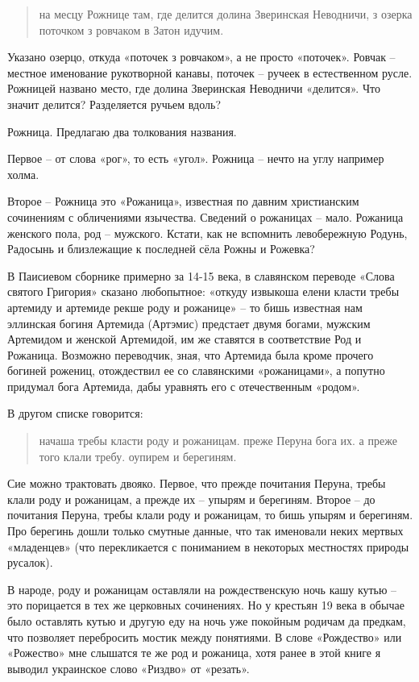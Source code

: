 \begin{quotation}
на месцу Рожнице там, где делится долина Зверинская Неводничи, з озерка поточком з ровчаком в Затон идучим.
\end{quotation} 

Указано озерцо, откуда «поточек з ровчаком», а не просто «поточек». Ровчак – местное именование рукотворной канавы, поточек – ручеек в естественном русле. Рожницей названо место, где долина Зверинская Неводничи «делится». Что значит делится? Разделяется ручьем вдоль?

Рожница. Предлагаю два толкования названия.

Первое – от слова «рог», то есть «угол». Рожница – нечто на углу например холма.

Второе – Рожница это «Рожаница», известная по давним христианским сочинениям с обличениями язычества. Сведений о рожаницах – мало. Рожаница женского пола, род – мужского. Кстати, как не вспомнить левобережную Родунь, Радосынь и близлежащие к последней сёла Рожны и Рожевка?

В Паисиевом сборнике примерно за 14-15 века, в славянском переводе «Слова святого Григория» сказано любопытное: «откуду извыкоша елени класти требы артемиду и артемиде рекше роду и рожанице» – то бишь известная нам эллинская богиня Артемида (Артэмис) предстает двумя богами, мужским Артемидом и женской Артемидой, им же ставятся в соответствие Род и Рожаница. Возможно переводчик, зная, что Артемида была кроме прочего богиней рожениц, отождествил ее со славянскими «рожаницами», а попутно придумал бога Артемида, дабы уравнять его с отечественным «родом».

В другом списке говорится: 

\begin{quotation}
начаша требы класти роду и рожаницам. преже Перуна бога их. а преже того клали требу. оупирем и берегиням.
\end{quotation}

Сие можно трактовать двояко. Первое, что прежде почитания Перуна, требы клали роду и рожаницам, а прежде их – упырям и берегиням. Второе – до почитания Перуна, требы клали роду и рожаницам, то бишь упырям и берегиням. Про берегинь дошли только смутные данные, что так именовали неких мертвых «младенцев» (что перекликается с пониманием в некоторых местностях природы русалок).

В народе, роду и рожаницам оставляли на рождественскую ночь кашу кутью – это порицается в тех же церковных сочинениях. Но у крестьян 19 века в обычае было оставлять кутью и другую еду на ночь уже покойным родичам да предкам, что позволяет перебросить мостик между понятиями. В слове «Рождество» или «Рожество» мне слышатся те же род и рожаница, хотя ранее в этой книге я выводил украинское слово «Риздво» от «резать».%

